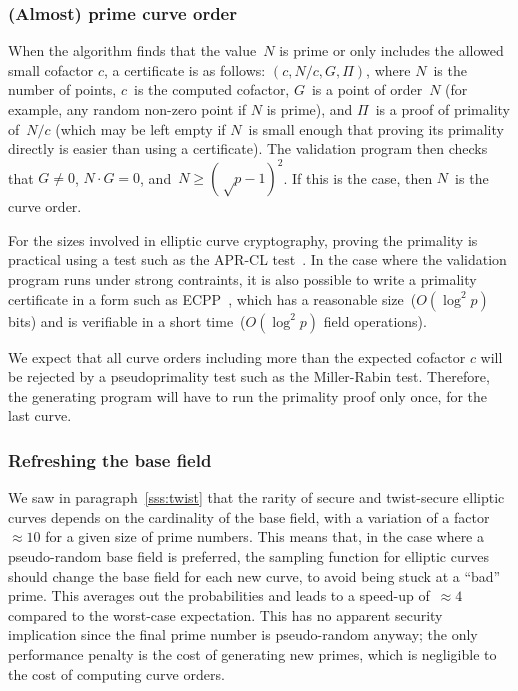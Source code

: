 \documentclass[twocolumn,letterpaper,10pt]{article}
\begin{document}
\subsubsection{(Almost) prime curve order}

When the algorithm finds that the value~$N$ is prime
or only includes the allowed small cofactor $c$,
a certificate is as follows: $(c, N/c, G, Π)$,
where $N$~is the number of points, $c$~is the computed cofactor,
$G$~is a point of order~$N$
(for example, any random non-zero point if $N$ is prime),
and $Π$~is a proof of primality of~$N/c$
(which may be left empty if $N$~is small enough
that proving its primality directly is easier than using a certificate).
The validation program then checks that $G ≠ 0$,
$N · G = 0$, and~$N ≥ (√p-1)^2$.
If this is the case, then $N$~is the curve order.

For the sizes involved in elliptic curve cryptography,
proving the primality is practical using a test such as
the APR-CL test~\cite{fcs1980adleman,mc1984cl}.
In the case where the validation program runs under strong contraints,
it is also possible to write a primality certificate
in a form such as ECPP~\cite{mc1993am},
which has a reasonable size~($O(\log^2 p)$ bits)
and is verifiable in a short time~($O(\log^2 p)$ field operations).

We expect that all curve orders including more than the expected cofactor $c$
will be rejected by a pseudoprimality test such as the Miller-Rabin test.
Therefore, the generating program will have to run the primality proof
only once, for the last curve.

\subsubsection{Refreshing the base field}

We saw in paragraph~\ref{sss:twist} that the rarity of
secure and twist-secure elliptic curves depends on the
cardinality of the base field,
with a variation of a factor~$≈ 10$ for a given size of prime numbers.
This means that,
in the case where a pseudo-random base field is preferred,
the sampling function for elliptic curves should change the base field
for each new curve, to avoid being stuck at a ``bad'' prime.
This averages out the probabilities
and leads to a speed-up of~$≈ 4$ compared to the worst-case expectation.
This has no apparent security implication
since the final prime number is pseudo-random anyway;
the only performance penalty is the cost of generating new primes,
which is negligible to the cost of computing curve orders.
\end{document}

